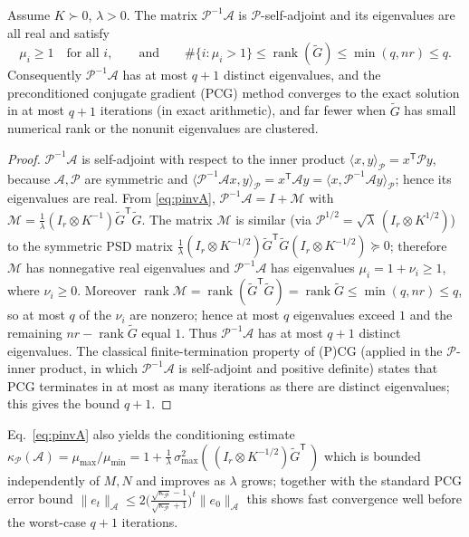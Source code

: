 \begin{proposition}\label{prop:spectrum}
Assume $K\succ0$, $\lambda>0$. The matrix $\mathcal P^{-1}\mathcal A$ is
$\mathcal P$-self-adjoint and its eigenvalues are all real and satisfy
\[
  \mu_i\ge1\quad\text{for all }i,
  \qquad\text{and}\qquad
  \#\{i:\mu_i>1\}\le \operatorname{rank}(\tilde G)\le \min(q,nr)\le q .
\]
Consequently $\mathcal P^{-1}\mathcal A$ has at most $q+1$ distinct eigenvalues, and the
preconditioned conjugate gradient (PCG) method converges to the exact solution in at
most $q+1$ iterations (in exact arithmetic), and far fewer when $\tilde G$ has small
numerical rank or the nonunit eigenvalues are clustered.
\end{proposition}
\begin{proof}
$\mathcal P^{-1}\mathcal A$ is self-adjoint with respect to the inner product
$\langle x,y\rangle_{\mathcal P}=x^{\mathsf T}\mathcal P y$, because
$\mathcal A,\mathcal P$ are symmetric and
$\langle \mathcal P^{-1}\mathcal A x,y\rangle_{\mathcal P}
=x^{\mathsf T}\mathcal A y
=\langle x,\mathcal P^{-1}\mathcal A y\rangle_{\mathcal P}$; hence its eigenvalues are
real. From \eqref{eq:pinvA}, $\mathcal P^{-1}\mathcal A=I+\mathcal M$ with
$\mathcal M=\tfrac1\lambda(I_r\otimes K^{-1})\tilde G^{\mathsf T}\tilde G$. The matrix
$\mathcal M$ is similar (via $\mathcal P^{1/2}=\sqrt\lambda\,(I_r\otimes K^{1/2})$) to
the symmetric PSD matrix
$\tfrac1\lambda(I_r\otimes K^{-1/2})\tilde G^{\mathsf T}\tilde G
(I_r\otimes K^{-1/2})\succeq0$; therefore $\mathcal M$ has nonnegative real eigenvalues
and $\mathcal P^{-1}\mathcal A$ has eigenvalues $\mu_i=1+\nu_i\ge1$, where $\nu_i\ge0$.
Moreover $\operatorname{rank}\mathcal M=\operatorname{rank}(\tilde G^{\mathsf T}
\tilde G)=\operatorname{rank}\tilde G\le\min(q,nr)\le q$, so at most $q$ of the $\nu_i$
are nonzero; hence at most $q$ eigenvalues exceed $1$ and the remaining
$nr-\operatorname{rank}\tilde G$ equal $1$. Thus $\mathcal P^{-1}\mathcal A$ has at most
$q+1$ distinct eigenvalues. The classical finite-termination property of (P)CG
(applied in the $\mathcal P$-inner product, in which $\mathcal P^{-1}\mathcal A$ is
self-adjoint and positive definite) states that PCG terminates in at most as many
iterations as there are distinct eigenvalues; this gives the bound $q+1$.
\end{proof}

\begin{remark}
Eq.~\eqref{eq:pinvA} also yields the conditioning estimate
$\kappa_{\mathcal P}(\mathcal A)=\mu_{\max}/\mu_{\min}
=1+\tfrac1\lambda\,\sigma_{\max}^2(\,(I_r\otimes K^{-1/2})\tilde G^{\mathsf T}\,)$
which is bounded independently of $M,N$ and improves as $\lambda$ grows; together with
the standard PCG error bound
$\|e_t\|_{\mathcal A}\le 2\big(\tfrac{\sqrt{\kappa_{\mathcal P}}-1}
{\sqrt{\kappa_{\mathcal P}}+1}\big)^{t}\|e_0\|_{\mathcal A}$ this shows fast convergence
well before the worst-case $q+1$ iterations.
\end{remark}

